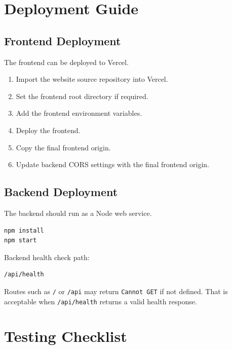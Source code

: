 \documentclass[12pt,a4paper]{article}
\begin{document}
\section{Deployment Guide}

\subsection{Frontend Deployment}

The frontend can be deployed to Vercel.

\begin{enumerate}[leftmargin=*]
    \item Import the website source repository into Vercel.
    \item Set the frontend root directory if required.
    \item Add the frontend environment variables.
    \item Deploy the frontend.
    \item Copy the final frontend origin.
    \item Update backend CORS settings with the final frontend origin.
\end{enumerate}

\subsection{Backend Deployment}

The backend should run as a Node web service.

\begin{lstlisting}
npm install
npm start
\end{lstlisting}

Backend health check path:

\begin{lstlisting}
/api/health
\end{lstlisting}

Routes such as \texttt{/} or \texttt{/api} may return \texttt{Cannot GET} if not defined. That is acceptable when \texttt{/api/health} returns a valid health response.

\section{Testing Checklist}
\end{document}
